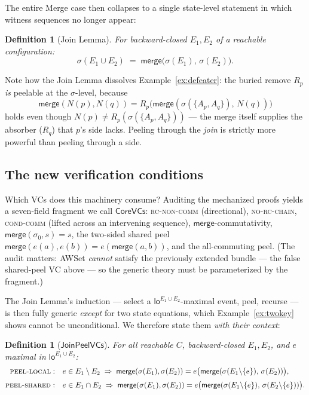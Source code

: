 \documentclass[11pt]{article}
\newtheorem{definition}[theorem]{Definition}
\newcommand{\Merge}{\mathsf{merge}}
\newcommand{\Sinit}{\sigma_0}
\newcommand{\loE}[1]{\mathsf{lo}^{#1}}
\newcommand{\co}{\mathsf{CoreVCs}}
\newcommand{\jp}{\mathsf{JoinPeelVCs}}
\begin{document}
The entire Merge case then collapses to a single state-level statement in
which witness sequences no longer appear:

\begin{definition}[Join Lemma]
For backward-closed $E_1, E_2$ of a reachable configuration:
\[
\sigma(E_1 \cup E_2) \;=\; \Merge\bigl(\sigma(E_1),\, \sigma(E_2)\bigr).
\]
\end{definition}

Note how the Join Lemma dissolves Example~\ref{ex:defeater}: the buried
remove $R_p$ \emph{is} peelable at the $\sigma$-level, because
\[
\Merge(N(p), N(q)) = R_p\bigl(\Merge(\sigma(\{A_p, A_q\}),\, N(q))\bigr)
\]
holds even though $N(p) \neq R_p(\sigma(\{A_p, A_q\}))$ --- the merge
itself supplies the absorber ($R_q$) that $p$'s side lacks. Peeling
through the \emph{join} is strictly more powerful than peeling through a
side.

\subsection{The new verification conditions}
\label{sec:newvcs}

Which VCs does this machinery consume? Auditing the mechanized proofs
yields a seven-field fragment we call $\co$:
\textsc{rc-non-comm} (directional), \textsc{no-rc-chain},
\textsc{cond-comm} (lifted across an intervening sequence),
$\Merge$-commutativity, $\Merge(\Sinit, s) = s$, the two-sided shared
peel $\Merge(e(a), e(b)) = e(\Merge(a,b))$, and the all-commuting peel.
(The audit matters: \textsf{AWSet} \emph{cannot} satisfy the previously
extended bundle --- the false shared-peel VC above --- so the generic
theory must be parameterized by the fragment.)

The Join Lemma's induction --- select a $\loE{E_1\cup E_2}$-maximal
event, peel, recurse --- is then fully generic \emph{except} for two
state equations, which Example~\ref{ex:twokey} shows cannot be
unconditional. We therefore state them \emph{with their context}:

\begin{definition}[$\jp$]
\label{def:jp}
For all reachable $C$, backward-closed $E_1, E_2$, and $e$ maximal in
$\loE{E_1 \cup E_2}$:
\begin{align*}
\textsc{peel-local}:&\quad e \in E_1 \setminus E_2 \;\Rightarrow\;
\Merge(\sigma(E_1), \sigma(E_2)) =
e\bigl(\Merge(\sigma(E_1{\setminus}\{e\}),\, \sigma(E_2))\bigr),\\[2pt]
\textsc{peel-shared}:&\quad e \in E_1 \cap E_2 \;\Rightarrow\;
\Merge(\sigma(E_1), \sigma(E_2)) =
e\bigl(\Merge(\sigma(E_1{\setminus}\{e\}),\, \sigma(E_2{\setminus}\{e\}))\bigr).
\end{align*}
\end{definition}
\end{document}
